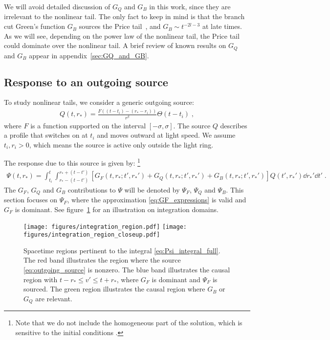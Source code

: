 \documentclass[reprint,aps,physrev,superscriptaddress,10pt,notitlepage,prd,nofootinbib,onecolumn]{revtex4-2}
\newcommand{\fref}[1]{figure~\ref{#1}}
\newcommand{\aref}[1]{appendix~\ref{#1}}
\begin{document}
We will avoid detailed discussion of $G_Q$ and $G_B$ in this work, since they are irrelevant to the nonlinear tail.
The only fact to keep in mind is that the branch cut Green's function $G_B$ sources the Price tail~\cite{Price:1971fb,Leaver:1986gd}, and $G_B \sim t^{-2l-3}$ at late times.
As we will see, depending on the power law of the nonlinear tail, the Price tail could dominate over the nonlinear tail.
A brief review of known results on $G_Q$ and $G_B$ appear in \aref{sec:GQ_and_GB}.





\subsection{Response to an outgoing source}
\label{sec:Psi_analytical_approximation}
To study nonlinear tails, we consider a generic outgoing source:
\begin{align}
  \label{eq:outgoing_source}
  Q(t,r_*) = \frac{F((t-t_i)-(r_*-r_i))}{r^\beta} \Theta(t-t_i) \;,
\end{align}
where $F$ is a function supported on the interval $[-\sigma,\sigma]$.
The source $Q$ describes a profile that switches on at $t_i$ and moves outward at light speed.
We assume $t_i, r_i > 0$, which means the source is active only outside the light ring.

The response due to this source is given by: \footnote{Note that we do not include the homogeneous part of the solution, which is sensitive to the initial conditions \cite{Chavda:2024awq}.}
\begin{align}
  \label{eq:Psi_integral_full}
  \Psi(t,r_*) = \int_{t_i}^t \int_{r_* - (t-t')}^{r_* + (t-t')} [ G_F(t,r_*;t',r_*') + G_Q(t,r_*;t',r_*') + G_B(t,r_*;t',r_*') ] Q(t',r_*') \dd{r_*'} \dd{t'} \;.
\end{align}
 The $G_F$, $G_Q$ and $G_B$ contributions to $\Psi$ will be denoted by $\Psi_F$, $\Psi_Q$ and $\Psi_B$.
This section focuses on $\Psi_F$, where the approximation \eqref{eq:GF_expressions} is valid and $G_F$ is dominant.
See \fref{fig:integration_region} for an illustration on integration domains.
\begin{figure}[t]
  \centering
  \texttt{[image: figures/integration\_region.pdf]}
  \texttt{[image: figures/integration\_region\_closeup.pdf]}
  \caption{Spacetime regions pertinent to the integral \eqref{eq:Psi_integral_full}.
    The red band illustrates the region where the source \eqref{eq:outgoing_source} is nonzero.
    The blue band illustrates the causal region with $t-r_* \leq v' \leq t+r_*$, where $G_F$ is dominant and $\Psi_F$ is sourced.
  The green region illustrates the causal region where $G_B$ or $G_Q$ are relevant.}
  \label{fig:integration_region}
\end{figure}
\end{document}
